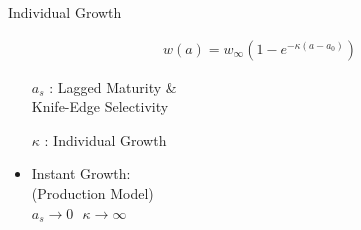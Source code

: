 \documentclass[ xcolor = pdftex, dvipsnames, table ]{beamer}
\begin{document}
%
\begin{frame}{Individual Growth}
%
\begin{minipage}[h!]{0.47\textwidth}
        \vspace{-1cm}
        \begin{align*}
        w(a) = w_\infty(1-e^{-\kappa (a-a_0)}) %
        \end{align*}
        \vspace*{-0.25cm}
        \begin{itemize}
	\setlength\itemsep{1em}
        \item[$a_s$ :] Lagged Maturity \&\\Knife-Edge Selectivity
	\item[$\kappa$ :] Individual Growth
	\item Instant Growth: \\(Production Model)\\
        $a_s \rightarrow 0 ~~~ \kappa \rightarrow \infty$\\$~$\\
        \end{itemize}
\end{minipage}
\begin{minipage}[h!]{0.51\textwidth}
\end{minipage}
\end{frame}
\end{document}
